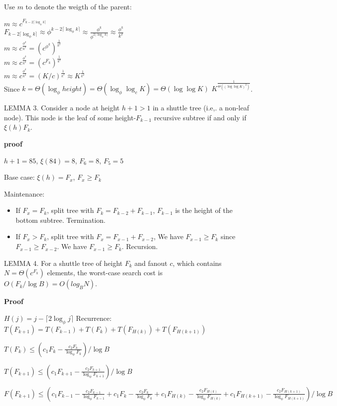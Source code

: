 \documentclass{book}
\begin{document}
Use $m$ to denote the weigth of the parent:

$m \approx c^{F_{k-2\lceil  \log_{\phi} k\rceil}}$\\
$F_{k-2\lceil  \log_{\phi} k\rceil} \approx \phi^{k-2\lceil  \log_{\phi} k\rceil}
\approx \frac{\phi^{k}}{\phi^{2\lceil  \log_{\phi} k\rceil}}
\approx \frac{\phi^{k}}{k^2}$\\
$m \approx c^{\frac{\phi^k}{k^2}} = (c^{\phi ^k})^{\frac{1}{k^2}}$\\
$m \approx c^{\frac{\phi^k}{k^2}} = (c^{F_{k}})^{\frac{1}{k^2}}$\\
$m \approx c^{\frac{\phi^k}{k^2}} = (K/c)^{\frac{1}{k^2}} \approx K^{\frac{1}{k^2}}$\\
Since $k = \Theta(\log_{\phi} height) =\Theta(\log_{\phi} \log_c K) = \Theta(\log \log K)$
 $K^{\frac{1}{\Theta((\log \log K)^2)}}$.


LEMMA 3. Consider a node at height $h+1>1$ in a shuttle tree
(i.e,. a non-leaf node). This node is the leaf of some height-$F_{k-1}$
recursive subtree if and only if $\xi(h) F_k$.

\textbf{proof}

$h+1=85$, $\xi(84) = 8$, $F_6=8$, $F_5=5$

Base case: $\xi(h) = F_x$, $F_x \geq F_k$

Maintenance:
\begin{itemize}
\item If $F_x = F_k$, split tree with $F_k = F_{k-2} + F_{k-1}$,  $F_{k-1}$ is the height of the bottom subtree. Termination.
\item If $F_x > F_k$, split tree with $F_x = F_{x-1} + F_{x-2}$,  We have $F_{x-1} \geq F_k$ since $F_{x-1} \geq F_{x-2}$. We have $F_{x-1} \geq F_k$. Recursion.
\end{itemize}


LEMMA 4. For a shuttle tree of height $F_k$ and fanout $c$, which contains $N = \Theta(c^{F_k})$ elements, the worst-case search cost is $O(F_k/\log B) = O(log_B N)$.

\textbf{Proof}

$H(j) = j - \lceil2\log_{\phi} j\rceil$
Recurrence: $T(F_{k+1}) = T(F_{k-1}) + T(F_k) + T(F_{H(k)}) + T(F_{H(k+1)})$

$T(F_k) \leq (c_1F_k-\frac{c_2F_k}{\log_{\phi}F_k})/\log B$

$T(F_{k+1}) \leq (c_1F_{k+1}-\frac{c_2F_{k+1}}{\log_{\phi}F_{k+1}})/\log B$

$F(F_{k+1}) \leq (c_1F_{k-1}-\frac{c_2F_{k-1}}{\log_{\phi}F_{k-1}} + c_1F_k-\frac{c_2F_k}{\log_{\phi}F_k} + c_1F_{H(k)}-\frac{c_2F_{H(k)}}{\log_{\phi}F_{H(k)}}+ c_1F_{H(k+1)}-\frac{c_2F_{H(k+1)}}{\log_{\phi}F_{H(k+1)}})/\log B$
\end{document}
